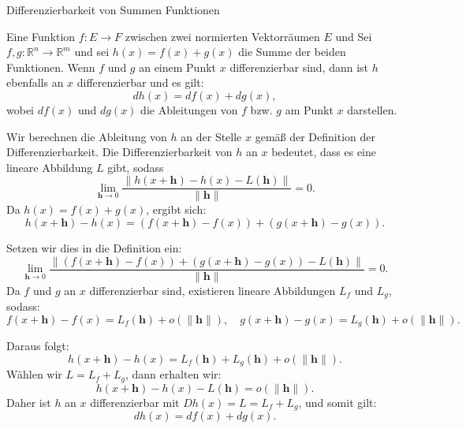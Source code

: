 \documentclass{beamer}
\begin{document}
\begin{frame}
    \begin{block}{Differenzierbarkeit von Summen Funktionen}

        Eine Funktion \( f : E \to F \) zwischen zwei normierten Vektorräumen \( E \) und
    Sei \( f, g : \mathbb{R}^n \rightarrow \mathbb{R}^m \) und sei \( h(x) = f(x) + g(x) \) die Summe der beiden Funktionen. Wenn \( f \) und \( g \) an einem Punkt \( x \) differenzierbar sind, dann ist \( h \) ebenfalls an \( x \) differenzierbar und es gilt:
    \[
    d h(x) = d f(x) + d g(x),
    \]
    wobei \( df(x) \) und \( dg(x) \) die Ableitungen von \( f \) bzw. \( g \) am Punkt \( x \) darstellen.
    \end{block}
\end{frame}

\begin{frame}
    Wir berechnen die Ableitung von \( h \) an der Stelle \( x \) gemäß der Definition der Differenzierbarkeit. Die Differenzierbarkeit von \( h \) an \( x \) bedeutet, dass es eine lineare Abbildung \( L \) gibt, sodass
    \[
    \lim_{\mathbf{h} \to 0} \frac{\| h(x + \mathbf{h}) - h(x) - L(\mathbf{h}) \|}{\|\mathbf{h}\|} = 0.
    \]
    Da \( h(x) = f(x) + g(x) \), ergibt sich:
    \[
    h(x + \mathbf{h}) - h(x) = (f(x + \mathbf{h}) - f(x)) + (g(x + \mathbf{h}) - g(x)).
    \]
\end{frame}

\begin{frame}
    Setzen wir dies in die Definition ein:
    \[
    \lim_{\mathbf{h} \to 0} \frac{\| (f(x + \mathbf{h}) - f(x)) + (g(x + \mathbf{h}) - g(x)) - L(\mathbf{h}) \|}{\|\mathbf{h}\|} = 0.
    \]
    Da \( f \) und \( g \) an \( x \) differenzierbar sind, existieren lineare Abbildungen \( L_f \) und \( L_g \), sodass:
    \[
    f(x + \mathbf{h}) - f(x) = L_f(\mathbf{h}) + o(\|\mathbf{h}\|), \quad g(x + \mathbf{h}) - g(x) = L_g(\mathbf{h}) + o(\|\mathbf{h}\|).
    \]
\end{frame}

\begin{frame}
    Daraus folgt:
    \[
    h(x + \mathbf{h}) - h(x) = L_f(\mathbf{h}) + L_g(\mathbf{h}) + o(\|\mathbf{h}\|).
    \]
    Wählen wir \( L = L_f + L_g \), dann erhalten wir:
    \[
    h(x + \mathbf{h}) - h(x) - L(\mathbf{h}) = o(\|\mathbf{h}\|).
    \]
    Daher ist \( h \) an \( x \) differenzierbar mit \( D h(x) = L = L_f + L_g \), und somit gilt:
    \[
    d h(x) = d f(x) + d g(x).
    \]
\end{frame}
\end{document}

